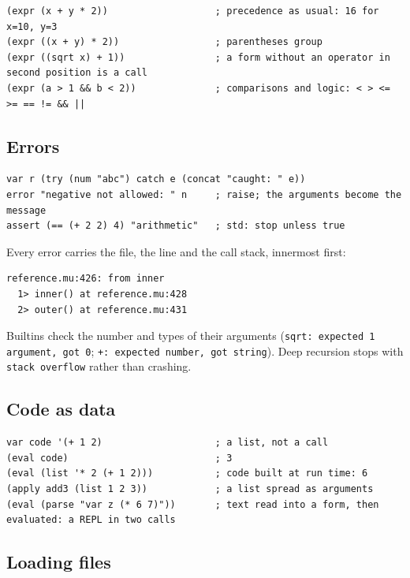 \documentclass[11pt,a4paper]{article}
\begin{document}
\begin{lstlisting}
(expr (x + y * 2))                   ; precedence as usual: 16 for x=10, y=3
(expr ((x + y) * 2))                 ; parentheses group
(expr ((sqrt x) + 1))                ; a form without an operator in second position is a call
(expr (a > 1 && b < 2))              ; comparisons and logic: < > <= >= == != && ||
\end{lstlisting}

\subsection{Errors}

\begin{lstlisting}
var r (try (num "abc") catch e (concat "caught: " e))
error "negative not allowed: " n     ; raise; the arguments become the message
assert (== (+ 2 2) 4) "arithmetic"   ; std: stop unless true
\end{lstlisting}

Every error carries the file, the line and the call stack, innermost first:

\begin{lstlisting}[numbers=none]
reference.mu:426: from inner
  1> inner() at reference.mu:428
  2> outer() at reference.mu:431
\end{lstlisting}

Builtins check the number and types of their arguments
(\texttt{sqrt: expected 1 argument, got 0}; \texttt{+: expected number, got string}).
Deep recursion stops with \texttt{stack overflow} rather than crashing.

\subsection{Code as data}

\begin{lstlisting}
var code '(+ 1 2)                    ; a list, not a call
(eval code)                          ; 3
(eval (list '* 2 (+ 1 2)))           ; code built at run time: 6
(apply add3 (list 1 2 3))            ; a list spread as arguments
(eval (parse "var z (* 6 7)"))       ; text read into a form, then evaluated: a REPL in two calls
\end{lstlisting}

\subsection{Loading files}
\end{document}
